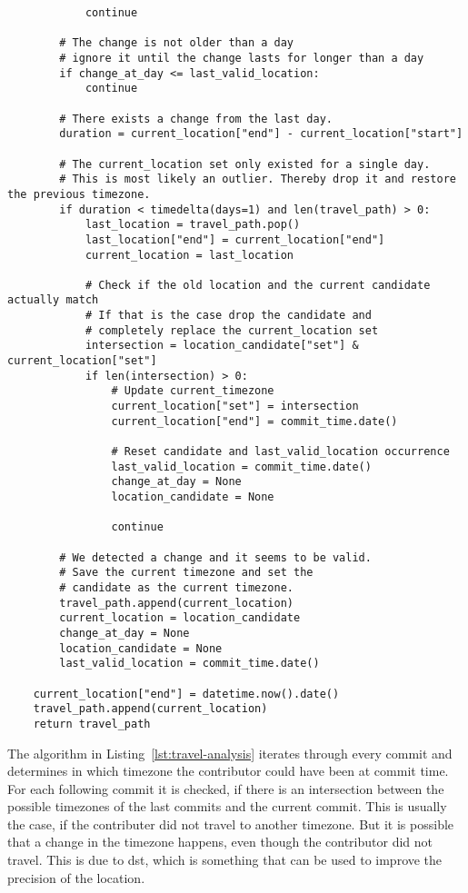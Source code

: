 \begin{verbatim}
            continue

        # The change is not older than a day
        # ignore it until the change lasts for longer than a day
        if change_at_day <= last_valid_location:
            continue

        # There exists a change from the last day.
        duration = current_location["end"] - current_location["start"]

        # The current_location set only existed for a single day.
        # This is most likely an outlier. Thereby drop it and restore the previous timezone.
        if duration < timedelta(days=1) and len(travel_path) > 0:
            last_location = travel_path.pop()
            last_location["end"] = current_location["end"]
            current_location = last_location

            # Check if the old location and the current candidate actually match
            # If that is the case drop the candidate and
            # completely replace the current_location set
            intersection = location_candidate["set"] & current_location["set"]
            if len(intersection) > 0:
                # Update current_timezone
                current_location["set"] = intersection
                current_location["end"] = commit_time.date()

                # Reset candidate and last_valid_location occurrence
                last_valid_location = commit_time.date()
                change_at_day = None
                location_candidate = None

                continue

        # We detected a change and it seems to be valid.
        # Save the current timezone and set the
        # candidate as the current timezone.
        travel_path.append(current_location)
        current_location = location_candidate
        change_at_day = None
        location_candidate = None
        last_valid_location = commit_time.date()

    current_location["end"] = datetime.now().date()
    travel_path.append(current_location)
    return travel_path
\end{verbatim}
\begingroup
{}\label{lst:travel-analysis}
\endgroup

The algorithm in Listing~\ref{lst:travel-analysis} iterates through every commit and determines in which timezone the contributor could have been at commit time.
For each following commit it is checked, if there is an intersection between the possible timezones of the last commits and the current commit.
This is usually the case, if the contributer did not travel to another timezone.
But it is possible that a change in the timezone happens, even though the contributor did not travel.
This is due to \ac{dst}, which is something that can be used to improve the precision of the location.

